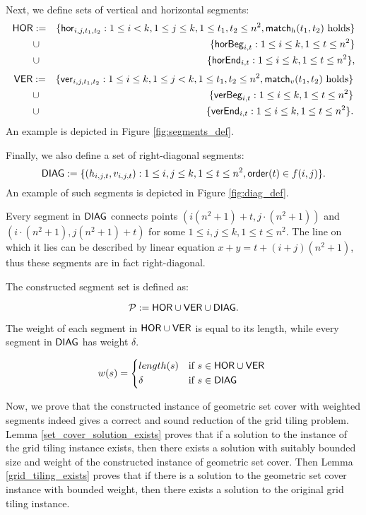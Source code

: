 Next, we define sets of vertical and horizontal segments:
\begin{eqnarray*}
\mathsf{HOR} &:= &\{\mathsf{hor}_{i,j,t_1,t_2} : 1 \le i < k, 1 \le j \le k,
1 \le t_1, t_2 \le n^2, \mathsf{match}_h(t_1, t_2) \text{ holds}\} \\
&\cup &\{\mathsf{horBeg}_{i,t} : 1 \le i \le k, 1 \le t \le n^2\}
\\
&\cup &\{\mathsf{horEnd}_{i,t} : 1 \le i \le k, 1 \le t \le n^2\},
\end{eqnarray*}
\begin{eqnarray*}
\mathsf{VER} &:= &\{\mathsf{ver}_{i,j,t_1,t_2} : 1 \le i \le k, 1 \le j < k,
1 \le t_1, t_2 \le n^2, \mathsf{match}_v(t_1, t_2) \text{ holds}\} \\
&\cup &\{\mathsf{verBeg}_{i,t} : 1 \le i \le k, 1 \le t \le n^2\}
\\
&\cup &\{\mathsf{verEnd}_{i,t} : 1 \le i \le k, 1 \le t \le n^2\}.
\end{eqnarray*}
An example is depicted in Figure \ref{fig:segments_def}.

Finally, we also define a set of right-diagonal segments:
$$\mathsf{DIAG} := \{ (h_{i, j, t}, v_{i, j, t}) :
	1 \le i, j \le k, 1 \le t \le n^2, \mathsf{order}(t) \in f(i, j)\}.$$
An example of such segments is depicted in Figure \ref{fig:diag_def}.



Every segment in $\mathsf{DIAG}$
connects points $(i(n^2+1) + t, j \cdot (n^2+1))$
and ${(i \cdot (n^2+1), j(n^2+1) + t)}$
for some $1 \le i,j \le k, 1 \le t \le n^2$.
The line on which it lies can be described
by linear equation ${x+y=t+(i+j)(n^2+1)}$,
thus these segments are in fact right-diagonal.

The constructed segment set is defined as:

$$\mathcal{P} := \mathsf{HOR} \cup \mathsf{VER} \cup \mathsf{DIAG}.$$

The weight of each segment in $\mathsf{HOR} \cup \mathsf{VER}$
is equal to its length,
while every segment in $\mathsf{DIAG}$ has weight
$\delta$.



\begin{equation}
w(s) =
	\begin{cases*}
	  length(s) 			& if $s \in \allhor \cup \allver$ \\
	  \delta        & if $s \in \alldiag$
	\end{cases*}
\end{equation}

Now, we prove that the constructed instance of geometric set cover
with weighted segments indeed gives a correct and sound reduction
of the grid tiling problem. Lemma \ref{set_cover_solution_exists}
proves that if a solution to the instance of the grid tiling instance exists,
then there exists a solution with suitably bounded size and weight
of the constructed instance of geometric set cover.
Then Lemma \ref{grid_tiling_exists} proves that if
there is a solution to the geometric set cover instance with bounded weight,
then there exists a solution to the original grid tiling instance.

